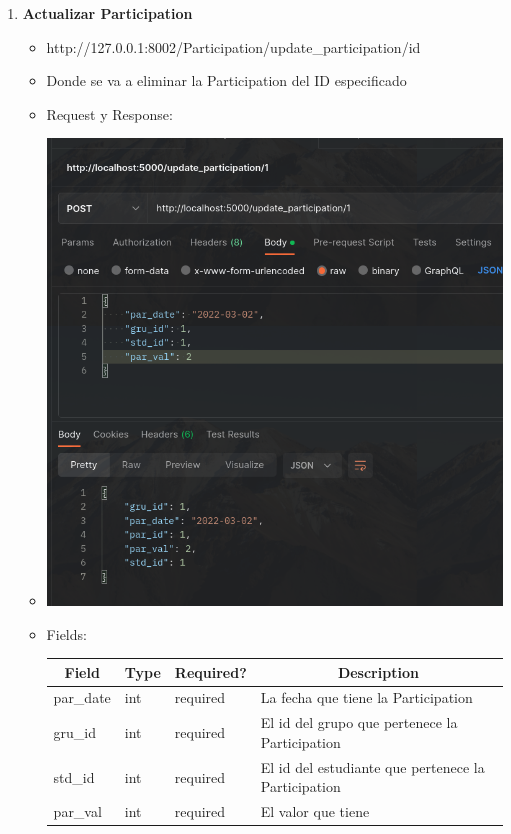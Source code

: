 \documentclass{article}
\begin{document}
\begin{enumerate}
    \item \textbf{Actualizar Participation}
    \begin{itemize}
        \item http://127.0.0.1:8002/Participation/update\_participation/id
        \item Donde se va a eliminar la Participation del ID
        especificado
        \item Request y Response:
        \item \includegraphics[scale=.5]{assets/participation/update.png}
        \item Fields:
        \begin{table}[H] \centering \begin{tabular}{|l|l|l|l|} \hline
        \multicolumn{1}{|c|}{\textbf{Field}} &
        \multicolumn{1}{c|}{\textbf{Type}} &
        \multicolumn{1}{c|}{\textbf{Required?}} &
        \multicolumn{1}{c|}{\textbf{Description}} \\ \hline par\_date & int &
        required & La fecha que tiene la Participation \\ \hline gru\_id & int &
        required & El id del grupo que pertenece la Participation \\ \hline
        std\_id & int & required & El id del estudiante que pertenece la
        Participation \\ \hline par\_val & int & required & El valor que tiene

\end{tabular}
\end{table}
\end{itemize}
\end{enumerate}
\end{document}
